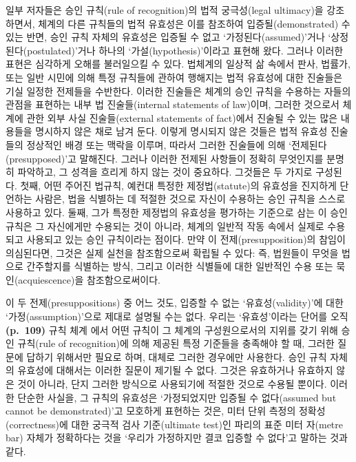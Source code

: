 일부 저자들은 승인 규칙(rule of recognition)의 법적 궁극성(legal
ultimacy)을 강조하면서, 체계의 다른 규칙들의 법적 유효성은 이를 참조하여
입증될(demonstrated) 수 있는 반면, 승인 규칙 자체의 유효성은 입증될 수
없고 ‘가정된다(assumed)’거나 ‘상정된다(postulated)’거나 하나의
‘가설(hypothesis)’이라고 표현해 왔다. 그러나 이러한 표현은 심각하게
오해를 불러일으킬 수 있다. 법체계의 일상적 삶 속에서 판사, 법률가, 또는
일반 시민에 의해 특정 규칙들에 관하여 행해지는 법적 유효성에 대한
진술들은 기실 일정한 전제들을 수반한다. 이러한 진술들은 체계의 승인
규칙을 수용하는 자들의 관점을 표현하는 내부 법 진술들(internal
statements of law)이며, 그러한 것으로서 체계에 관한 외부 사실
진술들(external statements of fact)에서 진술될 수 있는 많은 내용들을
명시하지 않은 채로 남겨 둔다. 이렇게 명시되지 않은 것들은 법적 유효성
진술들의 정상적인 배경 또는 맥락을 이루며, 따라서 그러한 진술들에 의해
‘전제된다(presupposed)’고 말해진다. 그러나 이러한 전제된 사항들이 정확히
무엇인지를 분명히 파악하고, 그 성격을 흐리게 하지 않는 것이 중요하다.
그것들은 두 가지로 구성된다. 첫째, 어떤 주어진 법규칙, 예컨대 특정한
제정법(statute)의 유효성을 진지하게 단언하는 사람은, 법을 식별하는 데
적절한 것으로 자신이 수용하는 승인 규칙을 스스로 사용하고 있다. 둘째,
그가 특정한 제정법의 유효성을 평가하는 기준으로 삼는 이 승인 규칙은 그
자신에게만 수용되는 것이 아니라, 체계의 일반적 작동 속에서 실제로
수용되고 사용되고 있는 승인 규칙이라는 점이다. 만약 이
전제(presupposition)의 참임이 의심된다면, 그것은 실제 실천을
참조함으로써 확립될 수 있다: 즉, 법원들이 무엇을 법으로 간주할지를
식별하는 방식, 그리고 이러한 식별들에 대한 일반적인 수용 또는
묵인(acquiescence)을 참조함으로써이다.

이 두 전제(presuppositions) 중 어느 것도, 입증할 수 없는
‘유효성(validity)’에 대한 ‘가정(assumption)’으로 제대로 설명될 수는
없다. 우리는 ‘유효성’이라는 단어를 오직 \textbf{(p.~109)} 규칙 체계
에서 어떤 규칙이 그 체계의 구성원으로서의 지위를 갖기
위해 승인 규칙(rule of recognition)에 의해 제공된 특정 기준들을 충족해야
할 때, 그러한 질문에 답하기 위해서만 필요로 하며, 대체로 그러한 경우에만
사용한다. 승인 규칙 자체의 유효성에 대해서는 이러한 질문이 제기될 수
없다. 그것은 유효하거나 유효하지 않은 것이 아니라, 단지 그러한 방식으로
사용되기에 적절한 것으로 수용될 뿐이다. 이러한 단순한 사실을, 그 규칙의
유효성은 ‘가정되었지만 입증될 수 없다(assumed but cannot be
demonstrated)’고 모호하게 표현하는 것은, 미터 단위 측정의
정확성(correctness)에 대한 궁극적 검사 기준(ultimate test)인 파리의 표준
미터 자(metre bar) 자체가 정확하다는 것을 ‘우리가 가정하지만 결코 입증할
수 없다’고 말하는 것과 같다.

